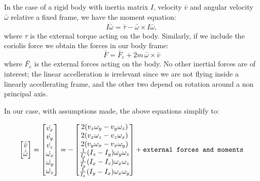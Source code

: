 
In the case of a rigid body with inertia matrix $I$, velocity $\bar{v}$ and angular velocity $\bar{\omega}$ relative a fixed frame, we have the moment equation:
\begin{equation}
    I \dot{\bar{\omega}} = \bar{\tau} - \bar{\omega} \times
    I \bar{\omega},
\end{equation}
where $\tau$ is the external torque acting on the body.
Similarly, if we include the coriolis force we obtain the forces in our body frame:
\begin{equation}
    \bar{F} = \bar{F}_{e} 
    + 2 m \, \bar{\omega} \times \bar{v}
\end{equation}
where $\bar{F_e}$ is the external forces acting on the body.
No other inertial forces are of interest;
the linear accelleration is irrelevant since we are not flying inside a linearly accellerating frame, and the other two depend on rotation around a non principal axis.

In our case, with assumptions made, the above equations simplify to:

\begin{equation}
\left[
\begin{matrix}
    \dot{\bar{v}} \\
    \dot{\bar{\omega}}
\end{matrix} \right]
=
\left[
\begin{matrix}
    \dot{v_x} \\
    \dot{v_y} \\
    \dot{v_z} \\
    \dot{\omega_x} \\ 
    \dot{\omega_y} \\
    \dot{\omega_z}
\end{matrix} \right] 
=
- \left[ \begin{matrix}
2 ( v_z \omega_y - v_y \omega_z )\\
2 ( v_x \omega_z - v_z \omega_x )\\
2 ( v_y \omega_x - v_x \omega_y )\\
\frac{1}{I_x} (I_z - I_y) \omega_y \omega_z \\
\frac{1}{I_y} (I_x - I_z) \omega_x \omega_z \\
\frac{1}{I_z} (I_y - I_x) \omega_x \omega_y 
\end{matrix} \right]
+ \verb!external forces and moments!
\end{equation}